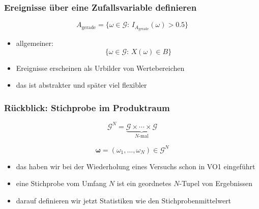 \documentclass[aspectratio=169,professionalfonts]{beamer}
\begin{document}
\begin{frame}
  \frametitle{Ereignisse \"uber eine Zufallsvariable definieren}

  \[
    A_{\mathrm{gerade}}=\{\omega\in\mathcal G:\,I_{A_{\mathrm{gerade}}}(\omega)>0.5\}
  \]

  \begin{center}
    
  \end{center}

  \vspace{0.2cm}

  \begin{itemize}
    \item allgemeiner:
    \[
      \{\omega\in\mathcal G:\,X(\omega)\in B\}
    \]
    \item Ereignisse erscheinen als Urbilder von Wertebereichen
    \item das ist abstrakter und sp\"ater viel flexibler
  \end{itemize}
\end{frame}

\begin{frame}
  \frametitle{R\"uckblick: Stichprobe im Produktraum}

  \[
    \mathcal G^N=\underbrace{\mathcal G\times\cdots\times\mathcal G}_{N\text{-mal}}
  \]

  \[
    \boldsymbol{\omega}=(\omega_1,\ldots,\omega_N)\in\mathcal G^N
  \]

  \begin{itemize}
    \item das haben wir bei der Wiederholung eines Versuchs schon in VO1 eingef\"uhrt
    \item eine Stichprobe vom Umfang \(N\) ist ein geordnetes \(N\)-Tupel von Ergebnissen
    \item darauf definieren wir jetzt Statistiken wie den Stichprobenmittelwert
  \end{itemize}
\end{frame}
\end{document}
